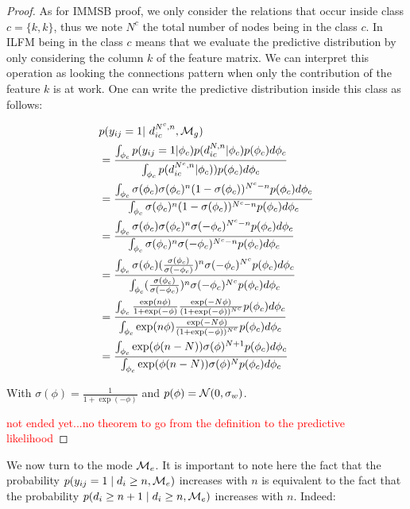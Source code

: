 \begin{proof}
As for IMMSB proof, we only consider the relations  that occur inside class $c=\{k,k\}$, thus we note $N^c$ the total number of nodes being in the class $c$. In ILFM being in the class $c$ means that we evaluate the predictive distribution by only considering the column $k$ of the feature matrix. We can interpret this operation as looking the connections pattern when only the contribution of the feature $k$ is at work. One can write the predictive distribution inside this class as follows:

\begin{align*}
&\p(y_{ij}=1 | d_{ic}^{N^c,n}, \M_g)  \\
&=  \frac{ \int_{\phi_{c}} p(y_{ij}=1|\phi_{c}) p(d_{ic}^{N,n} | \phi_{c}) p(\phi_{c}) d\phi_{c}}{\int_{\phi_{c}} \p(d_{ic}^{N^c,n} | \phi_{c}))       p(\phi_{c}) d\phi_{c}} \\
&= \frac{ \int_{\phi_{c}} \sigma(\phi_c) \sigma(\phi_c)^n (1-\sigma(\phi_c))^{N^c-n}     p(\phi_{c}) d\phi_{c}}{\int_{\phi_{c}}  \sigma(\phi_c)^n (1-\sigma(\phi_c))^{N^c-n}      p(\phi_{c}) d\phi_{c}} \\
&= \frac{ \int_{\phi_{c}} \sigma(\phi_c) \sigma(\phi_c)^n \sigma(-\phi_c)^{N^c-n}     p(\phi_{c}) d\phi_{c}}{\int_{\phi_{c}}  \sigma(\phi_c)^n \sigma(-\phi_c)^{N^c-n}      p(\phi_{c}) d\phi_{c}} \\
&= \frac{ \int_{\phi_{c}} \sigma(\phi_c) (\frac{\sigma(\phi_c)}{\sigma(-\phi_c)})^n \sigma(-\phi_c)^{N^c}     p(\phi_{c}) d\phi_{c}}{\int_{\phi_{c}}  (\frac{\sigma(\phi_c)}{\sigma(-\phi_c)})^n \sigma(-\phi_c)^{N^c}     p(\phi_{c}) d\phi_{c}} \\
&= \frac{ \int_{\phi_{c}} \frac{\exp(n\phi)}{1+\exp(-\phi)} \frac{\exp(-N\phi)}{(1+\exp(-\phi))^{N^c}}  p(\phi_{c}) d\phi_{c}}{\int_{\phi_{c}}  \exp(n\phi) \frac{\exp(-N\phi)}{(1+\exp(-\phi))^{N^c}}   p(\phi_{c}) d\phi_{c}} \\
&= \frac{ \int_{\phi_{c}} \exp(\phi(n-N)) \sigma(\phi)^{N+1} p(\phi_{c}) d\phi_{c}}{\int_{\phi_{c}} \exp(\phi(n-N)) \sigma(\phi)^{N} p(\phi_{c}) d\phi_{c}} \\
\end{align*}

With $\sigma(\phi) = \frac{1}{1+\exp(-\phi)}$ and $p(\phi) = \mathcal{N}(0, \sigma_w)$.


\textcolor{red}{not ended yet...no theorem to go from the definition to the predictive likelihood}
\end{proof}


We now turn to the mode $\mathcal{M}_e$. It is important to note here the fact that the probability $p(y_{ij}=1 \mid d_i \ge n, \mathcal{M}_e)$ increases with $n$ is equivalent to the fact that the probability $p(d_{i} \ge n+1 \mid d_i \ge n, \mathcal{M}_e)$ increases with $n$. Indeed:


